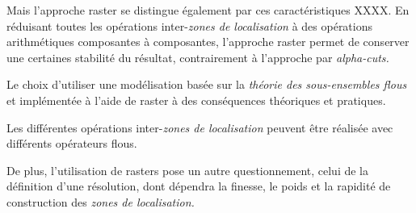
Mais l'approche raster se distingue également par ces caractéristiques
XXXX. En réduisant toutes les opérations inter-\emph{zones de
  localisation} à des opérations arithmétiques composantes à
composantes, l'approche raster permet de conserver une certaines
stabilité du résultat, contrairement à l'approche par
\emph{alpha-cuts.}


Le choix d'utiliser une modélisation basée sur la \emph{théorie des
  sous-ensembles flous} et implémentée à l'aide de raster à des
conséquences théoriques et pratiques.


Les différentes opérations inter-\emph{zones de localisation} peuvent
être réalisée avec différents opérateurs flous.


De plus, l'utilisation de rasters pose un autre questionnement, celui
de la définition d'une résolution, dont dépendra la finesse, le poids
et la rapidité de construction des \emph{zones de localisation.}

